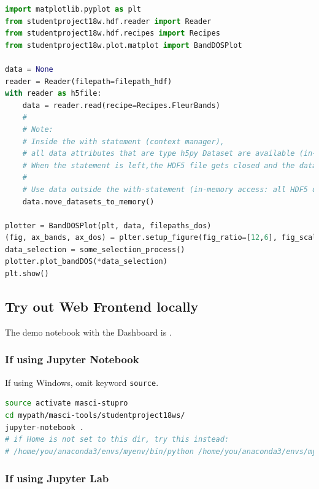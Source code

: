 \begin{lstlisting}[language=python, style=code]
import matplotlib.pyplot as plt
from studentproject18w.hdf.reader import Reader
from studentproject18w.hdf.recipes import Recipes
from studentproject18w.plot.matplot import BandDOSPlot

data = None
reader = Reader(filepath=filepath_hdf)
with reader as h5file:
    data = reader.read(recipe=Recipes.FleurBands)
    #
    # Note:
    # Inside the with statement (context manager),
    # all data attributes that are type h5py Dataset are available (in-file access)
    # When the statement is left,the HDF5 file gets closed and the datasets are closed.
    #
    # Use data outside the with-statement (in-memory access: all HDF5 datasets converted to numpy ndarrays):
    data.move_datasets_to_memory()

plotter = BandDOSPlot(plt, data, filepaths_dos)
(fig, ax_bands, ax_dos) = plter.setup_figure(fig_ratio=[12,6], fig_scale=1, fig_title="BandDOS")
data_selection = some_selection_process()
plotter.plot_bandDOS(*data_selection)
plt.show()
\end{lstlisting}

\subsection{Try out Web Frontend
locally}\label{try-out-web-frontend-locally}

The demo notebook with the Dashboard is
.

\subsubsection{If using Jupyter
Notebook}\label{if-using-jupyter-notebook}

If using Windows, omit keyword \texttt{source}.

\begin{lstlisting}[language=bash, style=code]
source activate masci-stupro
cd mypath/masci-tools/studentproject18ws/
jupyter-notebook .
# if Home is not set to this dir, try this instead:
# /home/you/anaconda3/envs/myenv/bin/python /home/you/anaconda3/envs/myenv/bin/jupyter-notebook .
\end{lstlisting}

\subsubsection{If using Jupyter Lab}\label{if-using-jupyter-lab}

